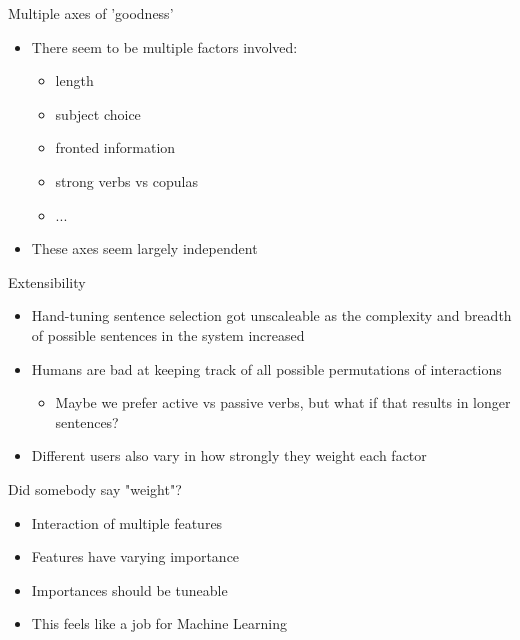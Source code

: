 \documentclass[10pt, compress]{beamer}
\begin{document}
\begin{frame}{Multiple axes of 'goodness'}
	\begin{itemize}
		\item There seem to be multiple factors involved:
		\begin{itemize}
			\item length
			\item subject choice
			\item fronted information
			\item strong verbs vs copulas
			\item ...	\pause
		\end{itemize}
		\item These axes seem largely independent
	\end{itemize}
\end{frame}

\begin{frame}{Extensibility}
	\begin{itemize}
		\item Hand-tuning sentence selection got unscaleable as the complexity
            and breadth of possible sentences in the system increased
		\item Humans are bad at keeping track of all possible permutations of interactions \pause
		\begin{itemize}
			\item Maybe we prefer active vs passive verbs, but what if that results in longer sentences? \pause
		\end{itemize}
		\item Different users also vary in how strongly they weight each factor
	\end{itemize}
\end{frame}

\begin{frame}{Did somebody say "weight"?}
	\begin{itemize}
		\item Interaction of multiple features %
		\item Features have varying importance %
		\item Importances should be tuneable \pause %
		\item This feels like a job for Machine Learning
	\end{itemize}
\end{frame}
\end{document}
